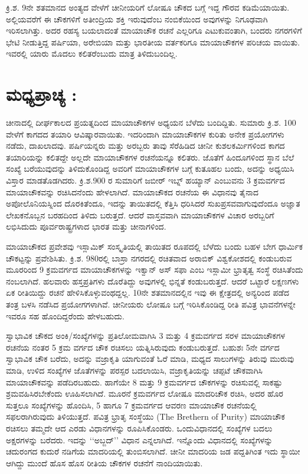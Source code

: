 ಕ್ರಿ.ಶ. 9ನೇ ಶತಮಾನದ ಅಂತ್ಯದ ವೇಳೆಗೆ ಚೀನೀಯರಿಗೆ ಲೋಷೂ ಚೌಕದ ಬಗ್ಗೆ ಇದ್ದ ಗೌರವ ಕಡಿಮೆಯಾಯಿತು. ಅಲ್ಲಿಯವರೆಗೆ ಈ ಚೌಕಗಳಿಗೆ ಅತೀಂದ್ರಿಯ ಶಕ್ತಿ ಇರುವುದೆಂಬ ನಂಬಿಕೆಯಿಂದ ಅವುಗಳನ್ನು ನಿಗೂಢವಾಗಿ ಇರಿಸಲಾಗಿತ್ತು. ಅದರ ರಹಸ್ಯ ಬಯಲಾದಂತೆ ಮಾಯಾಚೌಕ ರಚನೆ ಎಲ್ಲರಿಗೂ ಎಟುಕುವಂತಾಗಿ, ಬಂದರು ನಗರಗಳಿಗೆ ಭೇಟಿ ನೀಡುತ್ತಿದ್ದ ಪರ್ಷಿಯಾ, ಅರೇಬಿಯಾ ಮತ್ತು ಭಾರತೀಯ ವರ್ತಕರಿಗೂ ಮಾಯಾಚೌಕಗಳ ಪರಿಚಯ ವಾಯಿತು. ಇವರಲ್ಲಿ ಯಾರು ಮೊದಲು ಕಲಿತರೆಂಬುದು ಮಾತ್ರ ತಿಳಿದುಬಂದಿಲ್ಲ.

\section*{ಮಧ್ಯಪ್ರಾಚ್ಯ :}

ಚೀನಾದಲ್ಲಿ ದೀರ್ಘಕಾಲದ ಪ್ರಯತ್ನದಿಂದ ಮಾಯಾಚೌಕಗಳ ಅಧ್ಯಯನ ಬೆಳೆದು ಬಂದಿದ್ದಿತು. ಸುಮಾರು ಕ್ರಿ.ಶ. 100 ವೇಳೆಗೆ ಕಾಗದದ ತಯಾರಿ ಆವಿಷ್ಕಾರವಾಯಿತು. ಇದರಿಂದಾಗಿ ಮಾಯಾಚೌಕಗಳ ಕುರಿತು ಅನೇಕ ಪ್ರಯೋಗಗಳು ನಡೆದು, ದಾಖಲಾದವು. ಪರ್ಷಿಯನ್ನರು ಮತ್ತು ಅರಬ್ಬರು ತಾವು ಸೆರೆಹಿಡಿದ ಚೀನೀ ಕುಶಲಕರ್ಮಿಗಳಿಂದ ಕಾಗದ ತಯಾರಿಯನ್ನು ಕಲಿತದ್ದೇ ಅಲ್ಲದೇ ಮಾಯಾಚೌಕಗಳ ರಚನೆಯನ್ನೂ ಕಲಿತರು. ಜೊತೆಗೆ ಹಿಂದೂಗಳಿಂದ ಸ್ಥಾನ ಬೆಲೆ ಸಂಖ್ಯೆ ಬರೆಯುವುದನ್ನು ತಿಳಿದುಕೊಂಡಿದ್ದ ಅವರಿಗೆ ಮಾಯಾಚೌಕಗಳ ಬಗ್ಗೆ ಕುತೂಹಲ \linebreak ಬಂದು, ಅದನ್ನು ಅಧ್ಯಯಿಸಿ ವಿಸ್ತಾರ ಮಾಡತೊಡಗಿದರು. ಕ್ರಿ.ಶ.900 ರ ಸುಮಾರಿಗೆ ಜಬೀರ್ ಇಬ್ನ್ ಹಯ್ಯಾನ್ ಎಂಬುವನು 3 ಕ್ರಮವರ್ಗದ ಮಾಯಾಚೌಕವನ್ನು ರಚಿಸಿದನೆಂದು ಹೇಳ\-ಲಾಗಿದೆ. ಮಾಯಾಚೌಕದ ರಚನೆಯ ಈ ವಿಧಾನವು ತೈನಾದ ಅಪೋಲೊನಿಯಸ್ನಿಂದ ದೊರಕಿ\-ತೆಂದೂ, ಇದನ್ನು ತಾಯಿತದಲ್ಲಿ ಕೆತ್ತಿಸಿ ಧರಿಸಿದರೆ ಸುಖಪ್ರಸವವಾಗುವುದೆಂದೂ ಅಜ್ಞಾತ ಲೇಖಕ\-ನೊಬ್ಬನ ಬರಹದಿಂದ ತಿಳಿದು ಬರುತ್ತದೆ. ಆದರೆ ವಾಸ್ತವವಾಗಿ ಮಾಯಾಚೌಕಗಳ \linebreak ವಿಚಾರ ಅರಬ್ಬರಿಗೆ ಲಭಿಸಿದುದು ಪೂರ್ವರಾಷ್ಟ್ರಗಳಾದ ಭಾರತ ಮತ್ತು ಚೀನಾಗಳಿಂದ.

ಮಾಯಾಚೌಕದ ಪ್ರವೇಶವು ಇಸ್ಲಾಮಿಕ್ ಸಂಸ್ಕೃತಿಯಲ್ಲಿ ತಾಯಿತದ ರೂಪದಲ್ಲಿ ಬೆಳೆದು ಬಂದು ಬಹಳ ಬೇಗ ಧಾರ್ಮಿಕ ಚೌಕಟ್ಟನ್ನು ಪ್ರವೇಶಿಸಿತು. ಕ್ರಿ.ಶ. 980ರಲ್ಲಿ ಬಾಸ್ರಾ ನಗರದಲ್ಲಿ ರಚಿತವಾದ ಅರಾಬಿಕ್ ವಿಶ್ವಕೋಶದಲ್ಲಿ ಕಂಡುಬರುವ ಮೂರರಿಂದ 9 ಕ್ರಮವರ್ಗದ ಮಾಯಾಚೌಕಗಳನ್ನು ಇಕ್ವಾನ್ ಅಸ್ ಸಫಾ ಎಂಬ ಇಸ್ಲಾಮೀ ಭ್ರಾತೃತ್ವ ಸಂಸ್ಥೆ ರಚಿಸಿತೆಂದು ನಂಬಲಾಗಿದೆ. ಹಲವಾರು ಹಸ್ತಪ್ರತಿಗಳು ದೊರೆತಿದ್ದು ಅವುಗಳಲ್ಲಿ ಭಿನ್ನತೆ ಕಂಡುಬರುತ್ತದೆ. ಆದರೆ ಒಟ್ಟಾರೆ ಲಕ್ಷಣಗಳು ಏಕ ರೀತಿಯಿದ್ದು ರಚನೆ ಹೇಳಿಸಿಕೊಳ್ಳುವಂಥದ್ದಲ್ಲ. 10ನೇ ಶತಮಾನದಲ್ಲಿನ ಇವು ಈ ಕ್ಷೇತ್ರದಲ್ಲಿ ಅನ್ಯರಿಂದ ಪಡೆದ ತಂತ್ರ ಬಳಸಿ ನಡೆಸಿದ ಪ್ರಯೋಗಗಳಾಗಿವೆ. ಚೀನೀಯರು ಲೋಷೂ ಬಗ್ಗೆ ಇರಿಸಿಕೊಂಡಿದ್ದ ರೀತಿ ಪವಿತ್ರ ಭಾವನೆಗಳನ್ನೇ ಇವರೂ ಸಹ ಹೊಂದಿದ್ದರೆಂದು ಹೇಳಬಹುದು.

ಸ್ವಾಭಾವಿಕ ಚೌಕದ ಅಂಕಿ/ಸಂಖ್ಯೆಗಳನ್ನು ಪ್ರತಿಲೋಮವಾಗಿಸಿ 3 ಮತ್ತು 4 ಕ್ರಮವರ್ಗದ ಸರಳ ಮಾಯಾಚೌಕಗಳ ರಚನೆಯ ನಂತರ 5 ಕ್ರಮ ವರ್ಗದ ಚೌಕ ರಚಿಸಲು ಯತ್ನಿಸಿರು\-ವುದು ಕಂಡುಬರುತ್ತದೆ. ಬಹುಶಃ 5ನೇ ವರ್ಗದ ಸ್ವಾಭಾವಿಕ ಚೌಕ ಬರೆದು, ಅದನ್ನು ವಜ್ರಾಕೃತಿ ಯಾಗು\-ವಂತೆ ಓರೆ ಮಾಡಿ, ಮಧ್ಯದ ಸಾಲುಗಳನ್ನು ತಿರುವು ಮುರುವು ಮಾಡಿ, ಉಳಿದ ಸಂಖ್ಯೆಗಳ ಜೊತೆಗಳನ್ನು ಪರಸ್ಪರ ಬದಲಾಯಿಸಿ, ವಜ್ರಾಕೃತಿಯನ್ನು ಚಪ್ಪಟೆ ಚೌಕವಾಗಿಸಿ ಮಾಯಾಚೌಕವನ್ನು ಪಡೆದಿರಬಹುದು. ಹಾಗೆಯೇ 8 ಮತ್ತು 9 ಕ್ರಮವರ್ಗದ ಚೌಕಗಳನ್ನು ರಚಿಸುವಲ್ಲಿ ಸಾಕಷ್ಟು ಶ್ರಮವಹಿಸಿರಬೇಕೆಂದು ಊಹಿಸಲಾಗಿದೆ. ಮೂರನೆ ಕ್ರಮವರ್ಗದ ಲೋಷೂ ಮಾದರಿ\-ಚೌಕ ರಚಿಸಿ, ಅದರ ಹೊರ ಸುತ್ತಲೂ ಸಂಖ್ಯೆಗಳನ್ನು ಹೊಂದಿಸಿ, 5 ಹಾಗೂ 7 ಕ್ರಮ\-ವರ್ಗದ ಆವರಣ ಮಾಯಾಚೌಕ ರಚನೆಯಲ್ಲಿ ಸಫಲರಾಗಿರುವುದು ತಿಳಿಯುತ್ತದೆ. ಪವಿತ್ರ ಭ್ರಾತೃ ಸಂಸ್ಥೆಯು (The Brethern of Purity) ಮಾಯಾಚೌಕ ರಚಿಸಲು ತಮ್ಮದೇ ಆದ ಎರಡು ವಿಧಾನಗಳನ್ನು ರೂಪಿಸಿಕೊಂಡರು. ಒಂದುವಿಧಾನದಲ್ಲಿ ಸಂಖ್ಯೆಗಳ ಬದಲು ಅಕ್ಷರಗಳನ್ನು ಬರೆದರು. ಇದನ್ನು ‘‘ಅಬ್ಜದ್’’ ವಿಧಾನ ಎನ್ನಲಾಗಿದೆ. ಇನ್ನೊಂದು ವಿಧಾನದಲ್ಲಿ ಸಂಖ್ಯೆ\-ಗಳನ್ನು ಚದುರಂಗದ ಕುದುರೆ ನಡಿಗೆಯ ಮಾದರಿಯಲ್ಲಿ ತುಂಬಿಸಲಾಗಿದೆ. ಚೀನೀ \break ಮಾದರಿಯ ಜಡ ಪದ್ದತಿಗಿಂತ ಇದು ಸ್ಥಾಯೀ ಆಗಿದ್ದು ಮುಂದೆ ಹೊಸ ಹೊಸ ರೀತಿಯ ಚೌಕಗಳ ರಚನೆಗೆ ನಾಂದಿಯಾಯಿತು.

